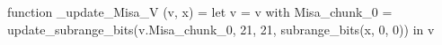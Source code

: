 function _update_Misa_V (v, x) = let v = { v with Misa_chunk_0 = update_subrange_bits(v.Misa_chunk_0, 21, 21, subrange_bits(x, 0, 0)) } in
  v

